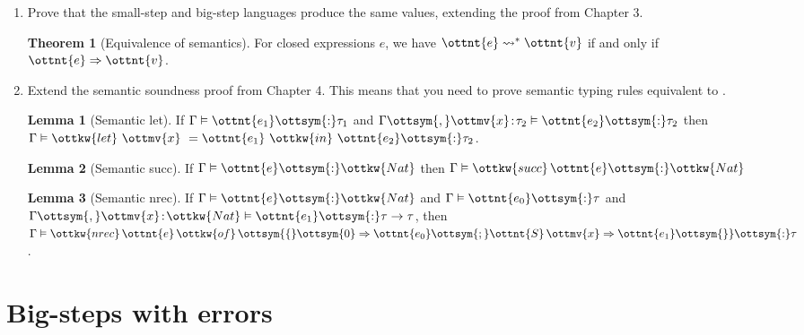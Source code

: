 \documentclass{article}
\theoremstyle{definition}
\newtheorem{theorem}{Theorem}[section]
\newtheorem{lemma}{Lemma}[section]
\begin{document}
\begin{enumerate}
\item
Prove that the small-step and big-step languages produce the same 
values, extending the proof from Chapter 3.
\begin{theorem}[Equivalence of semantics] 
For closed expressions $e$, we have $\ottnt{e}  \leadsto^{\ast}  \ottnt{v}$ if and only if $\ottnt{e}  \Rightarrow  \ottnt{v}$.
\end{theorem}

\item
Extend the semantic soundness proof from Chapter 4.
This means that you need to prove semantic typing rules equivalent 
to .

\begin{lemma}[Semantic let] 
If $\Gamma  \vDash  \ottnt{e_{{\mathrm{1}}}}  \ottsym{:}  \tau_{{\mathrm{1}}}$ and $\Gamma  \ottsym{,}   \ottmv{x} \! :\! \tau_{{\mathrm{2}}}   \vDash  \ottnt{e_{{\mathrm{2}}}}  \ottsym{:}  \tau_{{\mathrm{2}}}$ 
then $\Gamma  \vDash   \ottkw{let} \  \ottmv{x} \ =  \ottnt{e_{{\mathrm{1}}}} \ \ottkw{in}\  \ottnt{e_{{\mathrm{2}}}}   \ottsym{:}  \tau_{{\mathrm{2}}}$.
\end{lemma}

\begin{lemma}[Semantic succ] 
If $\Gamma  \vDash  \ottnt{e}  \ottsym{:}  \ottkw{Nat}$ then $\Gamma  \vDash  \ottkw{succ} \, \ottnt{e}  \ottsym{:}  \ottkw{Nat}$
\end{lemma}

\begin{lemma}[Semantic nrec] 
If $\Gamma  \vDash  \ottnt{e}  \ottsym{:}  \ottkw{Nat}$ and $\Gamma  \vDash  \ottnt{e_{{\mathrm{0}}}}  \ottsym{:}  \tau$ and $\Gamma  \ottsym{,}   \ottmv{x} \! :\! \ottkw{Nat}   \vDash  \ottnt{e_{{\mathrm{1}}}}  \ottsym{:}  \tau  \to  \tau$, 
then $\Gamma  \vDash  \ottkw{nrec} \, \ottnt{e} \, \ottkw{of} \, \ottsym{\{}  \ottsym{0}  \Rightarrow  \ottnt{e_{{\mathrm{0}}}}  \ottsym{;}  \ottnt{S} \, \ottmv{x}  \Rightarrow  \ottnt{e_{{\mathrm{1}}}}  \ottsym{\}}  \ottsym{:}  \tau$.
\end{lemma}


\end{enumerate}

\newpage

\section{Big-steps with errors}
\end{document}
